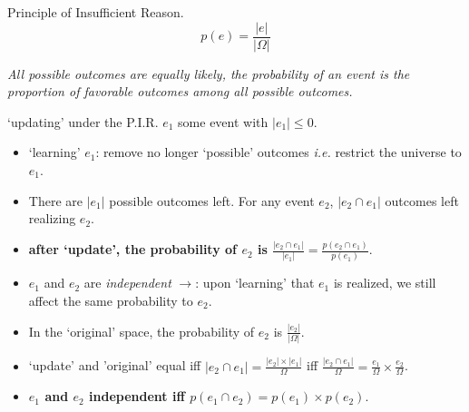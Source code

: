 \documentclass{beamer}
\begin{document}
\begin{frame}{Principle of Insufficient Reason.}
  \[ p(e) = \frac{|e|}{|\Omega|}\]

  
  \emph{All possible outcomes are equally likely, the probability of an event is the proportion of favorable outcomes among all possible outcomes.}
\end{frame}

\begin{frame}{`updating' under the P.I.R.}
  $e_1$ some event with $|e_1| \le 0$.
  \begin{itemize}
  \item `learning' $e_1$: remove no longer `possible' outcomes \emph{i.e.} restrict the universe to $e_1$. 
  \item There are $|e_1|$ possible outcomes left. For any event $e_2$, $|e_2 \cap e_1|$ outcomes left realizing $e_2$.
  \item \textbf{after `update', the probability of $e_2$ is $\frac{|e_2 \cap e_1|}{|e_1|} = \frac{p(e_2 \cap e_1)}{p(e_1)}$}.
  \item $e_1$ and $e_2$ are \emph{independent} $\rightarrow$: upon `learning' that $e_1$ is realized, we still affect the same probability to $e_2$.
  \item In the `original' space, the probability of $e_2$ is $\frac{|e_2|}{|\Omega|}$.
  \item `update' and 'original' equal iff $|e_2 \cap e_1| = \frac{|e_2|\times|e_1|}{\Omega}$ iff $\frac{|e_2 \cap e_1|}{\Omega} = \frac{e_1}{\Omega}\times \frac{e_2}{\Omega}$.
  \item \textbf{$e_1$ and $e_2$ independent iff $p(e_1 \cap e_2) = p(e_1) \times p(e_2)$}.
  \end{itemize}  
\end{frame}
\end{document}
